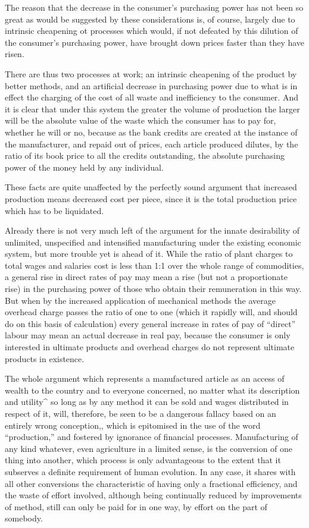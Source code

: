 \documentclass{book}
\begin{document}
The reason that the decrease in the consumer’s purchasing power has not been so great as would be suggested by these considerations is, of course, largely due to intrinsic cheapening ot processes which would, if not defeated by this dilution of the consumer’s purchasing power, have brought down prices faster than they have risen.

There are thus two processes at work; an intrinsic cheapening of the product by better methods, and an artificial decrease in purchasing power due to what is in effect the charging of the cost of all waste and inefficiency to the consumer. And it is clear that under this system the greater the volume of production the larger will be the absolute value of the waste which the consumer has to pay for, whether he will or no, because as the bank credits are created at the instance of the manufacturer, and repaid out of prices, each article produced dilutes, by the ratio of its book price to all the credits outstanding, the absolute purchasing power of the money held by any individual.

These facts are quite unaffected by the perfectly sound argument that increased production means decreased cost per piece, since it is the total production price which has to be liquidated.

Already there is not very much left of the argument for the innate desirability of unlimited, unspecified and intensified manufacturing under the existing economic system, but more trouble yet is ahead of it. While the ratio of plant charges to total wages and salaries cost is less than 1:1 over the whole range of commodities, a general rise in direct rates of pay may mean a rise (but not a proportionate rise) in the purchasing power of those who obtain their remuneration in this way. But when by the increased application of mechanical methods the average overhead charge passes the ratio of one to one (which it rapidly will, and should do on this basis of calculation) every general increase in rates of pay of “direct” labour may mean an actual decrease in real pay, because the consumer is only interested in ultimate products and overhead charges do not represent ultimate products in existence.

The whole argument which represents a manufactured article as an access of wealth to the country and to everyone concerned, no matter what its description and utility\textasciicircum{} so long as by any method it can be sold and wages distributed in respect of it, will, therefore, be seen to be a dangerous fallacy based on an entirely wrong conception,, which is epitomised in the use of the word “production,” and fostered by ignorance of financial processes. Manufacturing of any kind whatever, even agriculture in a limited sense, is the conversion of one thing into another, which process is only advantageous to the extent that it subserves a definite requirement of human evolution. In any case, it shares with all other conversions the characteristic of having only a fractional efficiency, and the waste of effort involved, although being continually reduced by improvements of method, still can only be paid for in one way, by effort on the part of somebody.
\end{document}

